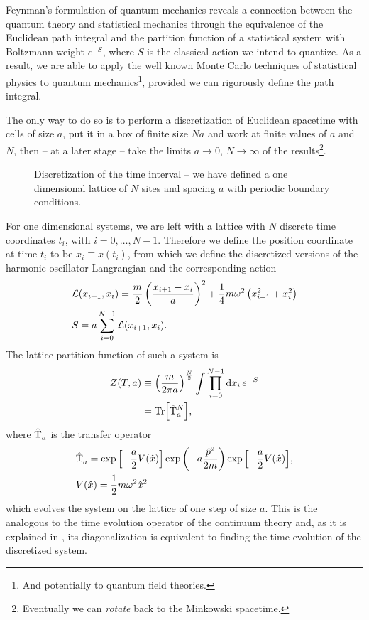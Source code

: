 Feynman's formulation of quantum mechanics reveals a connection
between the quantum theory and statistical mechanics through the equivalence of the
Euclidean path integral and the partition function of a statistical system with Boltzmann weight $e^{-S}$, where $S$ is the classical action
we intend to quantize.
As a result, we are able to apply the well known
Monte Carlo techniques of statistical physics to quantum mechanics\footnote{And potentially to quantum field theories.},
provided we can rigorously define the path integral.

The only way to do so is to perform a discretization of Euclidean spacetime with cells of size $a$, put it in a box of finite size $Na$ and
work at finite values of $a$ and $N$, then -- at a later stage -- take the limits $a\to 0$, $N\to\infty$ of the results\footnote{Eventually we can \textit{rotate} back to the Minkowski spacetime.}.

\begin{figure}[h]
\centering
{}
\caption{Discretization of the time interval -- we have defined a one dimensional lattice of $N$ sites and spacing $a$ with periodic boundary conditions.}
\label{fig:Timediscr}
\end{figure}

For one dimensional systems, we are left with a lattice with $N$ discrete time coordinates $t_{i}$, with $i = 0,\dots, N-1$. Therefore we define the position coordinate at time $t_{i}$ to be $x_{i}\equiv x(t_{i})$,
from which we define the discretized versions of the harmonic oscillator Langrangian and the corresponding action
\begin{align}
  &\mathcal{L}(x_{i+1}, x_i) = \frac{m}{2}\left(\frac{x_{i+1}-x_{i}}{a}\right)^2 + \frac{1}{4}m\omega ^2 \left(x_{i+1}^2+x_{i}^2\right)\label{eqn:dlag}\\
  &S = a\sum_{i=0}^{N-1}\mathcal{L}(x_{i+1}, x_i).
\end{align}
The lattice partition function of such a system is
\begin{align}
  \label{eqn:Zlattice}
  Z(T,a) &\equiv \left(\frac{m}{2\pi a}\right)^{\frac{N}{2}}\int \prod_{i=0}^{N-1} \dd{x}_{i}e ^{-S} \notag\\
  &= \Tr[\hat{\operatorname{T}}_a^{N}] ,
\end{align}
where $\hat{\operatorname{T}}_a^{}$ is the transfer operator
\begin{align}
  &\hat{\operatorname{T}}_a^{} = \exp\qty[-\frac{a}{2}V(\hat{x})]\exp\qty(-a \frac{\hat{p} ^2}{2m})\exp\qty[-\frac{a}{2}V(\hat{x})], \notag \\
   &V(\hat{x}) = \frac{1}{2}m\omega^{2}\hat{x}^{2}
\end{align}
which evolves the system on the lattice of one step of size $a$. This is the analogous to the time evolution operator of the continuum theory and,
as it is explained in \cite{Creutz1981ASA}, its
diagonalization is equivalent to finding the time evolution of the discretized system.


